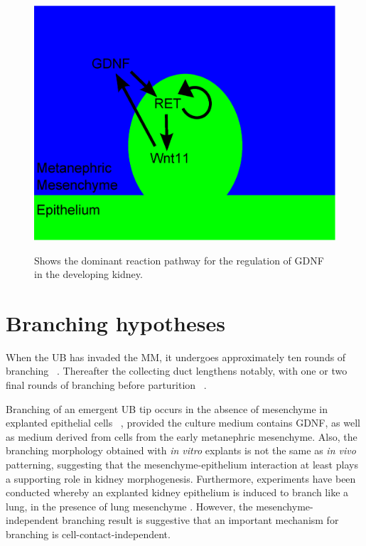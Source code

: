\documentclass[pdftex,10pt,a4paper,twocolumn]{article}
\begin{document}
\begin{figure}[t] 
\centering
\scalebox{0.35} 
{\includegraphics{pathways.eps}}
\caption{Shows the dominant reaction pathway for the regulation of GDNF in the developing kidney.}\label{fig:pathways}
\end{figure} 

\section{Branching hypotheses}\label{sec:branchinghyp}
When the UB has invaded the MM, it undergoes approximately ten rounds of branching ~\cite{srinivas1999expression}. Thereafter the collecting duct lengthens notably, with one or two final rounds of branching before parturition ~\cite{cebrian2004morphometric}.

Branching of an emergent UB tip occurs in the absence of mesenchyme in explanted epithelial cells ~\cite{qiao1999branching}, provided the culture medium contains GDNF, as well as medium derived from cells from the early metanephric mesenchyme. Also, the branching morphology obtained with \textit{in vitro} explants is not the same as \textit{in vivo} patterning, suggesting that the mesenchyme-epithelium interaction at least plays a supporting role in kidney morphogenesis. Furthermore, experiments have been conducted whereby an explanted kidney epithelium is induced to branch like a lung, in the presence of lung mesenchyme \cite{lin2001induced}. However, the mesenchyme-independent branching result is suggestive that an important mechanism for branching is cell-contact-independent.
\end{document}
